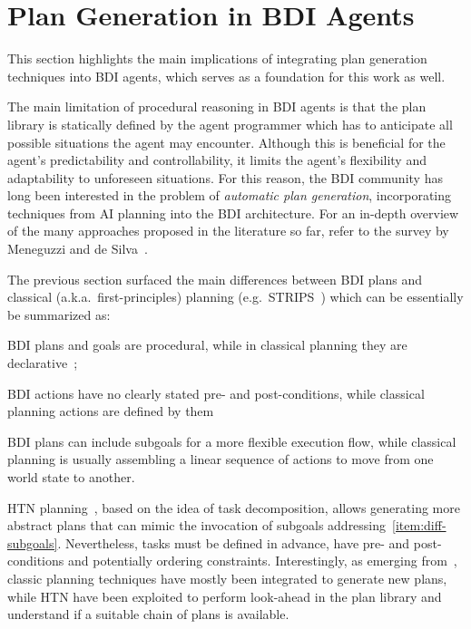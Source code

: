 \documentclass[12pt,a4paper,openright,twoside]{book}
\begin{document}
\section{Plan Generation in BDI Agents}

This section highlights the main implications of integrating plan generation techniques into \ac{BDI} agents, which serves as a foundation for this work as well.

The main limitation of procedural reasoning in \ac{BDI} agents is that the plan library is statically defined by the agent programmer which has to anticipate all possible situations the agent may encounter.
%
Although this is beneficial for the agent's predictability and controllability, it limits the agent's flexibility and adaptability to unforeseen situations.
%
For this reason, the \ac{BDI} community has long been interested in the problem of \emph{automatic plan generation}, incorporating techniques from \ac{AI} planning into the \ac{BDI} architecture.
%
For an in-depth overview of the many approaches proposed in the literature so far, refer to the survey by Meneguzzi and de Silva~\cite{MeneguzziS15}.

The previous section surfaced the main differences between \ac{BDI} plans and classical (a.k.a.\ first-principles) planning (e.g.\, STRIPS~\cite{fikes1971ai}) which can be essentially be summarized as:
%
\begin{inlinelist}
    \item \ac{BDI} plans and goals are procedural, while in classical planning they are declarative~\cite{winikoff2002kr};
    \item \ac{BDI} actions have no clearly stated pre- and post-conditions, while classical planning actions are defined by them
    \item \label{item:diff-subgoals} \ac{BDI} plans can include subgoals for a more flexible execution flow, while classical planning is usually assembling a linear sequence of actions to move from one world state to another.
\end{inlinelist}
%
\ac{HTN} planning~\cite{georgievski2015ai}, based on the idea of task decomposition, allows generating more abstract plans that can mimic the invocation of subgoals addressing~\ref{item:diff-subgoals}.
%
Nevertheless, tasks must be defined in advance, have pre- and post-conditions and potentially ordering constraints.
%
Interestingly, as emerging from~\cite{MeneguzziS15}, classic planning techniques have mostly been integrated to generate new plans, while \ac{HTN} have been exploited to perform look-ahead in the plan library and understand if a suitable chain of plans is available.
\end{document}
